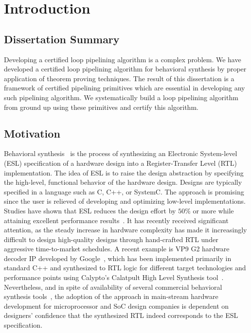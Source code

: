 \chapter{Introduction}
\label{sec:dissertation-thesis}

\section {Dissertation Summary}
Developing a certified loop pipelining algorithm is a complex problem.
We have developed a certified loop pipelining algorithm for behavioral synthesis 
by proper application of theorem proving techniques. The result of this dissertation 
is a framework of certified pipelining primitives which are essential in developing 
any such pipelining algorithm. We systematically build a loop pipelining algorithm 
from ground up using these primitives and certify this algorithm.

\section {Motivation}
Behavioral synthesis~\cite{GMT09,hls-book-2007} is the process of synthesizing an
Electronic System-level (ESL) specification of a hardware
design into a Register-Transfer Level (RTL) implementation.
The idea of ESL is to raise the design abstraction by specifying the high-level,
functional behavior of the hardware design. Designs are
typically specified in a language such as C, C++, or SystemC.
The approach is promising since the user is relieved of
developing and optimizing low-level implementations. 
Studies have shown that ESL 
reduces the design effort by $50\%$ or more while attaining
excellent performance results~\cite{Moussa99}. 
It has recently received significant attention, as the steady 
increase in hardware complexity has made it increasingly 
difficult to design high-quality designs through hand-crafted RTL under 
aggressive time-to-market schedules.  A recent example is VP9 G2 hardware
decoder IP developed by Google~\cite{googledecoder}, which has been implemented primarily in 
standard C++ and synthesized to RTL logic for different target technologies 
and performance points using Calypto's Calatpult High Level Synthesis 
tool~\cite{catapult}. Nevertheless, and in spite of availability of several
commercial behavioral synthesis tools~\cite{ctos,forte,vivado},
the adoption of the approach in main-stream hardware development for
microprocessor and SoC design companies is dependent on 
designers' confidence that the synthesized RTL indeed corresponds to the ESL
specification. 

